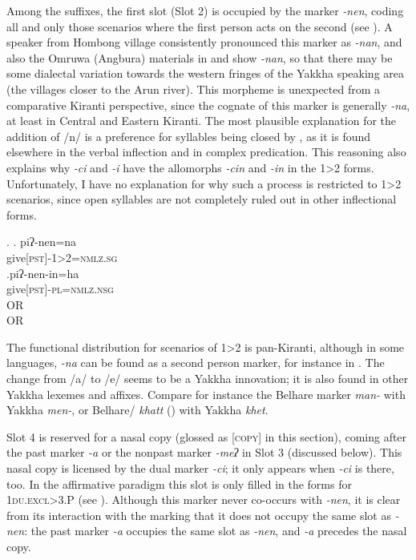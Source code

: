 
Among the suffixes, the first  slot (Slot 2) is occupied by the marker \emph{-nen}, coding all and only those scenarios where  the first person acts on the second (see \Next). A speaker from Hombong  village consistently pronounced this marker as \emph{-nan}, and also the Omruwa (Angbura) materials in \citet{Driem1994The-Yakkha} and  \citet{Gvozdanovic1987How} show \emph{-nan}, so that there may be some dialectal variation towards the western fringes of the Yakkha speaking area (the villages closer to the Arun river). This morpheme is unexpected from a comparative Kiranti perspective, since the cognate of this marker is generally  \emph{-na}, at least in Central and Eastern Kiranti. The most plausible explanation for the addition of /n/ is  a preference for  syllables being closed by , as it is found elsewhere in the verbal inflection and in complex predication. This reasoning also explains why \emph{-ci} and \emph{-i} have the allomorphs \emph{-cin} and \emph{-in} in the 1>2 forms.  Unfortunately, I have no explanation for why such a process is  restricted to 1>2 scenarios, since open syllables are not completely ruled out in other inflectional forms.


\ex. \ag. piʔ-nen=na\\
	give{\scshape [pst]-1>2=nmlz.sg}\\
	\bg.\label{ex-nenin}piʔ-nen-in=ha\\
	give{\scshape [pst]-pl=nmlz.nsg}\\
	 OR\\
	 OR\\

The functional distribution for scenarios of 1>2 is  pan-Kiranti, although in some languages, \emph{-na} can be found as a second person marker, for instance in  \citep[148]{Lahaussois2002Thulung}. The change from /a/ to /e/ seems to be a Yakkha innovation; it is also found in other Yakkha lexemes and affixes. Compare for instance the Belhare  marker \emph{man-} with Yakkha \emph{men-}, or Belhare/ \emph{khatt} () with Yakkha \emph{khet}. 
	


Slot 4 is reserved for a nasal copy (glossed as {\scshape [copy]} in this section), coming after the past marker  \emph{-a} or the nonpast marker \emph{-meʔ} in Slot 3 (discussed below). This nasal copy is licensed by the dual marker \emph{-ci}; it only appears  when \emph{-ci} is there, too. In the affirmative paradigm this slot is only filled in the forms for {\scshape 1du.excl>3.P} (see \Next). Although this marker never co-occurs with \emph{-nen}, it is clear from its interaction with the  marking that it does not occupy the same slot as \emph{-nen}: the past marker \emph{-a} occupies the same slot as \emph{-nen}, and \emph{-a} precedes the nasal copy.

